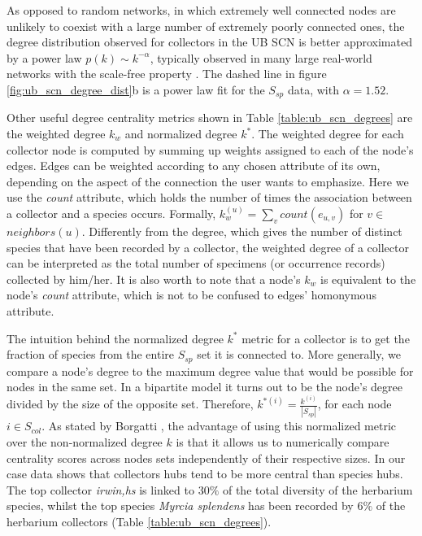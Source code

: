 As opposed to random networks, in which extremely well connected nodes are unlikely to coexist with a large number of extremely poorly connected ones, the degree distribution observed for collectors in the UB SCN is better approximated by a power law $p(k) \sim k^{-\alpha}$, typically observed in many large real-world networks with the scale-free property \cite{Barabasi1999a}. The dashed line in figure \ref{fig:ub_scn_degree_dist}b is a power law fit for the $S_{sp}$ data, with $\alpha=1.52$. 
  
Other useful degree centrality metrics shown in Table \ref{table:ub_scn_degrees} are the weighted degree $k_w$ and normalized degree $k^*$. The weighted degree for each collector node is computed by summing up weights assigned to each of the node's edges. Edges can be weighted according to any chosen attribute of its own, depending on the aspect of the connection the user wants to emphasize. Here we use the \textit{count} attribute, which holds the number of times the association between a collector and a species occurs. Formally, $k_w^{(u)} = \sum_{v} count(e_{u,v})$ for $v \in$ $neighbors(u)$. Differently from the degree, which gives the number of distinct species that have been recorded by a collector, the weighted degree of a collector can be interpreted as the total number of specimens (or occurrence records) collected by him/her. It is also worth to note that a node's $k_w$ is equivalent to the node's \textit{count} attribute, which is not to be confused to edges' homonymous attribute.

The intuition behind the normalized degree $k^*$ metric for a collector is to get the fraction of species from the entire $S_{sp}$ set it is connected to. More generally, we compare a node's degree to the maximum degree value that would be possible for nodes in the same set. In a bipartite model it turns out to be the node's degree divided by the size of the opposite set. Therefore, $k^{*(i)} = \frac{k^{(i)}}{|S_{sp}|}$, for each node $i \in S_{col}$. 
As stated by Borgatti \cite{Borgatti2015}, the advantage of using this normalized metric over the non-normalized degree $k$ is that it allows us to numerically compare centrality scores across nodes sets independently of their respective sizes. 
In our case data shows that collectors hubs tend to be more central than species hubs. The top collector \textit{irwin,hs} is linked to $30\%$ of the total diversity of the herbarium species, whilst the top species \textit{Myrcia splendens} has been recorded by $6\%$ of the herbarium collectors (Table \ref{table:ub_scn_degrees}). 



